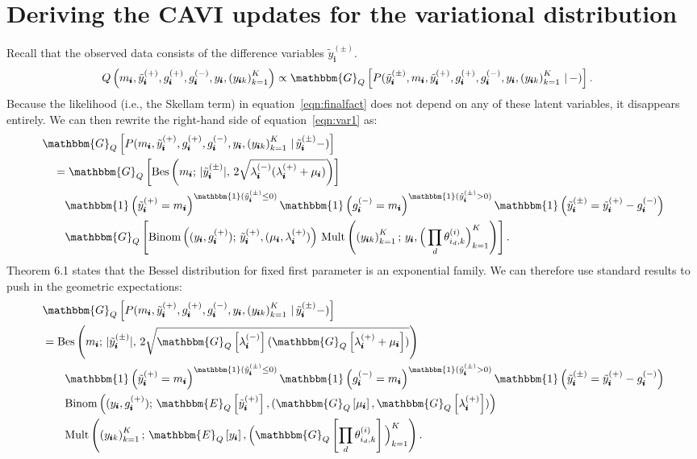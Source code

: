 \documentclass[letterpaper]{article}
\newcommand{\subs}{\pmb{i}}
\newcommand{\wsup}[2]{#1_{\subs}^{(#2)}}
\newcommand{\ytP}{\wsup{\tilde{y}}{+}}
\newcommand{\ytPM}{\wsup{\tilde{y}}{\pm}}
\newcommand{\ysk}{y_{\subs k}}
\newcommand{\ys}{y_{\subs}}
\newcommand{\lamP}{\wsup{\lambda}{+}}
\newcommand{\lamM}{\wsup{\lambda}{-}}
\newcommand{\gP}{\wsup{g}{+}}
\newcommand{\gM}{\wsup{g}{-}}
\newcommand{\ms}{m_{\subs}}
\newcommand{\Eq}[1]{\mathbbm{E}_Q\left[#1\right]}
\newcommand{\Gq}[1]{\mathbbm{G}_Q\left[#1\right]}
\begin{document}
  \section{Deriving the CAVI updates for the variational distribution}
  \label{sec:cavi}
  Recall that the observed data consists of the difference variables $\ytPM$.
  \begin{align}
    \label{eqn:var1}
  Q\left(\ms, \ytP, \gP, \gM, \ys, \left(\ysk\right)_{k=1}^K\right) &\propto \Gq{P(\ytPM, \ms, \ytP, \gP, \gM, \ys, \left(\ysk\right)_{k=1}^K \,|\,-)}.
  \end{align}
  Because the likelihood (i.e., the Skellam term) in
  equation~\ref{eqn:finalfact} does not depend on any of these latent variables,
  it disappears entirely.  We can then rewrite the right-hand side of
  equation~\ref{eqn:var1} as:
  \begin{align}
  &\Gq{P(\ms, \ytP, \gP, \gM, \ys, \left(\ysk\right)_{k=1}^K \,|\,\ytPM-)}\notag\\
  &\quad= \Gq{\text{Bes}\left(\ms;\, |\ytPM|,\,2\sqrt{\lamM(\lamP+\mu_{\subs})}\right)}\notag\\
  &\quad\quad \mathbbm{1} \left(\ytP=\ms\right)^{\mathbbm{1}(\ytPM \leq 0)} \mathbbm{1} \left(\gM=\ms\right)^{\mathbbm{1}(\ytPM > 0)} \mathbbm{1}\left(\ytPM = \ytP - \gM\right)\notag\\
  &\quad\quad \Gq{\text{Binom}\left((\ys, \gP);\,
      \ytP, (\mu_{\subs}, \lamP)\right) \,
      \text{Mult}\left(\left(\ysk\right)_{k=1}^K;\, \ys,
      \Big( \prod_d \theta_{i_d,k}^{(i)} \Big)_{k=1}^K\right)}.
    \end{align}
    Theorem 6.1 states that the Bessel distribution for fixed first parameter is
    an exponential family. We can therefore use standard results to push in the
    geometric expectations:
    \begin{align}
  &\Gq{P(\ms, \ytP, \gP, \gM, \ys, \left(\ysk\right)_{k=1}^K \,|\,\ytPM-)}\notag\\
  &= \text{Bes}\left(\ms;\, | \ytPM|,\,2\sqrt{\Gq{\lamM}(\Gq{\lamP +\mu_{\subs}})}\right)\notag\\
  &\quad\quad \mathbbm{1} \left(\ytP=\ms\right)^{\mathbbm{1}(\ytPM \leq 0)} \mathbbm{1} \left(\gM=\ms\right)^{\mathbbm{1}(\ytPM > 0)} \mathbbm{1}\left(\ytPM = \ytP - \gM\right)\notag\\
  &\quad\quad \text{Binom}\left((\ys, \gP);\,
      \Eq{\ytP}, (\Gq{\mu_{\subs}},
      \Gq{\lamP})\right)\notag\\
      &\quad\quad \text{Mult}\left(\left(\ysk\right)_{k=1}^K;\, \Eq{\ys}, \Big(\Gq{ \prod_d \theta_{i_d,k}^{(i)} }\Big)_{k=1}^K\right).
  \end{align}
  
\end{document}
